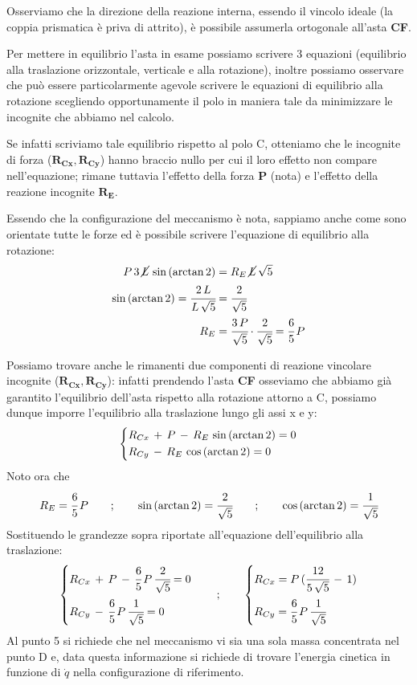 Osserviamo che la direzione della reazione interna, essendo il vincolo ideale (la coppia prismatica è priva di attrito), è possibile assumerla ortogonale all'asta \textbf{CF}.

Per mettere in equilibrio l'asta in esame possiamo scrivere 3 equazioni (equilibrio alla traslazione orizzontale, verticale e alla rotazione), inoltre possiamo osservare che può essere particolarmente agevole scrivere le equazioni di equilibrio alla rotazione scegliendo opportunamente il polo in maniera tale da minimizzare le incognite che abbiamo nel calcolo.

Se infatti scriviamo tale equilibrio rispetto al polo C, otteniamo che le incognite di forza ($\mathbf{R_{Cx}},\mathbf{R_{Cy}}$) hanno braccio nullo per cui il loro effetto non compare nell'equazione; rimane tuttavia l'effetto della forza \textbf{P} (nota) e l'effetto della reazione incognite $\mathbf{R_E}$.

Essendo che la configurazione del meccanismo è nota, sappiamo anche come sono orientate tutte le forze ed è possibile scrivere l'equazione di equilibrio alla rotazione:
\begin{align*}
P\,3\,\cancel{L} \,\sin{(\arctan{2})} &= R_E\,\cancel{L}\,\sqrt{5}\\
\sin{(\arctan{2})} = \cfrac{2\,L}{L\,\sqrt{5}} &= \cfrac{2}{\sqrt{5}}\\
R_E &= \cfrac{3\,P}{\sqrt{5}}\cdot\cfrac{2}{\sqrt{5}} = \cfrac{6}{5}\,P
\end{align*}

Possiamo trovare anche le rimanenti due componenti di reazione vincolare incognite ($\mathbf{R_{Cx}} , \mathbf{R_{Cy}}$): infatti prendendo l'asta \textbf{CF} osseviamo che abbiamo già garantito l'equilibrio dell'asta rispetto alla rotazione attorno a C, possiamo dunque imporre l'equilibrio alla traslazione lungo gli assi x e y:
\[
\begin{dcases}
R_{Cx}\,+\,P\,-\,R_E\,\sin{(\arctan{2})} = 0 \\
R_{Cy}\,-\,R_E\,\cos{(\arctan{2})} = 0
\end{dcases}
\]
Noto ora che 
\[R_E = \cfrac{6}{5}\,P\qquad;\qquad \sin{(\arctan{2})} = \cfrac{2}{\sqrt{5}}\qquad;\qquad\cos{(\arctan{2})} = \cfrac{1}{\sqrt{5}}\]
Sostituendo le grandezze sopra riportate all'equazione dell'equilibrio alla traslazione:
\[
\begin{dcases}
R_{Cx}\,+\,P\,-\,\cfrac{6}{5}\,P\, \cfrac{2}{\sqrt{5}} = 0 \\
R_{Cy}\,-\, \cfrac{6}{5}\,P\, \cfrac{1}{\sqrt{5}} = 0
\end{dcases}
\qquad;\qquad
\begin{dcases}
R_{Cx}=P\,(\cfrac{12}{5\,\sqrt{5}}\,-\,1)\\
R_{Cy}=\cfrac{6}{5}\,P\,\cfrac{1}{\sqrt{5}}
\end{dcases}
\]
Al punto 5 si richiede che nel meccanismo vi sia una sola massa concentrata nel punto D e, data questa informazione si richiede di trovare l'energia cinetica in funzione di $\dot{q}$ nella configurazione di riferimento.

